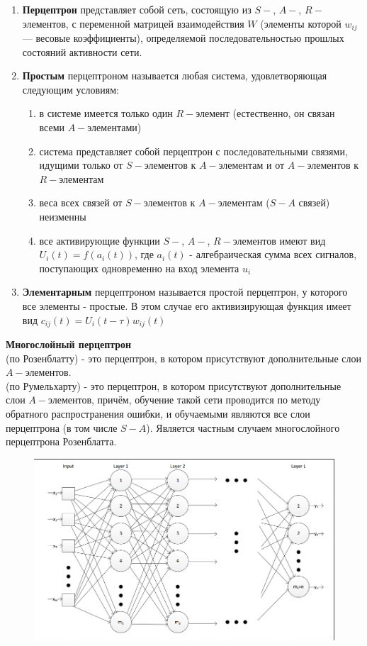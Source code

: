 \documentclass[paper=a4, fontsize=11pt]{scrartcl} %
\numberwithin{equation}{section} %
\numberwithin{figure}{section} %
\numberwithin{table}{section} %
\begin{document}
	\begin{enumerate}
	\item \textbf{Перцептрон} представляет собой сеть, состоящую из $S-$, $A-$, $R-$элементов, с переменной матрицей взаимодействия $W$ (элементы которой $w_{ij}$ — весовые коэффициенты), определяемой последовательностью прошлых состояний активности сети.
	\item \textbf{Простым} перцептроном называется любая система, удовлетворяющая следующим условиям:
	\begin{enumerate}	
		\item в системе имеется только один $R-$элемент (естественно, он связан всеми $A-$элементами)
		\item система представляет собой перцептрон с последовательными связями, идущими только от $S-$элементов к $A-$элементам и от $A-$элементов к $R-$элементам
		\item веса всех связей от $S-$элементов к $A-$элементам ($S-A$ связей) неизменны
		\item все активирующие функции $S-$, $A-$, $R-$элементов имеют вид $U_{i}(t)=f(a_{i}(t))$, где $a_{i}(t)$ - алгебраическая сумма всех сигналов, поступающих одновременно на вход элемента $u_{i}$
	\end{enumerate}
	\item \textbf{Элементарным} перцептроном называется простой перцептрон, у которого все элементы - простые. В этом случае его активизирующая функция имеет вид $c_{ij}(t)=U_{i}(t-\tau )w_{ij}(t)$
	\end{enumerate}

	\textbf{Многослойный перцептрон}\\
	(по Розенблатту) - это перцептрон, в котором присутствуют дополнительные слои $A-$элементов.\\
	(по Румельхарту) - это перцептрон, в котором присутствуют дополнительные слои $A-$элементов, причём, обучение такой сети проводится по методу обратного распространения ошибки, и обучаемыми являются все слои перцептрона (в том числе $S-A$). Является частным случаем многослойного перцептрона Розенблатта.
	
	\begin{figure}[h!]
		\centering
		\includegraphics[scale=0.45]{mlp}
	\end{figure}
	
\end{document}
